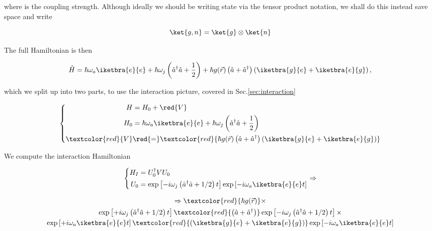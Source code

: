 \noindent where  is the
coupling strength. Although  ideally we should be writing  state via the
tensor product notation, we shall do this instead save space and write

\begin{equation}
  \ket{g,n}=\ket{g}\otimes\ket{n}
\end{equation}

\noindent The full Hamiltonian is then

\begin{equation}
  \hat{H} = \hbar\omega_a\iketbra{e}{e} + \hbar\omega_j\left(\hat{a}^\dagger\hat{a}+\frac{1}{2}\right) + {\hbar g(\vec{r})}\left(\hat{a}+\hat{a}^\dagger\right)\left(\iketbra{g}{e}+\iketbra{e}{g}\right),
\end{equation}

\noindent  which we  split up  into two  parts, to  use the  interaction
picture, covered in Sec.\ref{sec:interaction}

\begin{equation}
  \left\lbrace
    \begin{aligned}
      H & = H_0+\red{V}\\
      H_0 & = \hbar\omega_a\iketbra{e}{e} + \hbar\omega_j\left(\hat{a}^\dagger\hat{a}+\frac{1}{2}\right)\\
      \textcolor{red}{V}       &        \red{=}       \textcolor{red}{{\hbar
          g(\vec{r})}\left(\hat{a}+\hat{a}^\dagger\right)\left(\iketbra{g}{e}+\iketbra{e}{g}\right)}
    \end{aligned}\right.
  \label{eqn:lightAtomHamiltonians}
\end{equation}

\noindent We compute the interaction Hamiltonian

\begin{equation}
  \left\lbrace
    \begin{aligned}
      H_I & = U_0^\dagger V U_0 \\
      U_0                               &                              =
      \exp\left[-i\omega_j\left(\hat{a}^\dagger\hat{a}+{1}/{2}\right)t\right]\exp\left[-i\omega_a\iketbra{e}{e}t\right]
    \end{aligned}\right. \Rightarrow
\end{equation}

\begin{multline}
  \Rightarrow \textcolor{red}{\hbar g(\vec{r})} \times \\
  \exp\left[+i\omega_j\left(\hat{a}^\dagger\hat{a}+{1}/{2}\right)t\right]\textcolor{red}{\left(\hat{a}+\hat{a}^\dagger\right)}\exp\left[-i\omega_j\left(\hat{a}^\dagger\hat{a}+{1}/{2}\right)t\right] \times\\
  \exp\left[+i\omega_a\iketbra{e}{e}t\right]\textcolor{red}{\left(\iketbra{g}{e}+\iketbra{e}{g}\right)}\exp\left[-i\omega_a\iketbra{e}{e}t\right]
\end{multline}

